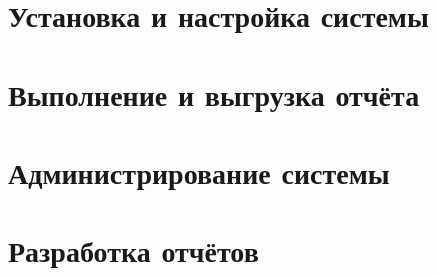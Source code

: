 \documentclass[a4paper, 11pt]{scrbook}
\begin{document}
	
	
	
	
	
	\tableofcontents

	\chapter{Установка и настройка системы} \label{chapter:installation-and-settings}
	
	
	\chapter{Выполнение и выгрузка отчёта} \label{chapter:report-running}
		
	
	\chapter{Администрирование системы} \label{chapter:administration}
	
	
	\chapter{Разработка отчётов} \label{chapter:developing}
	
	
\end{document}
